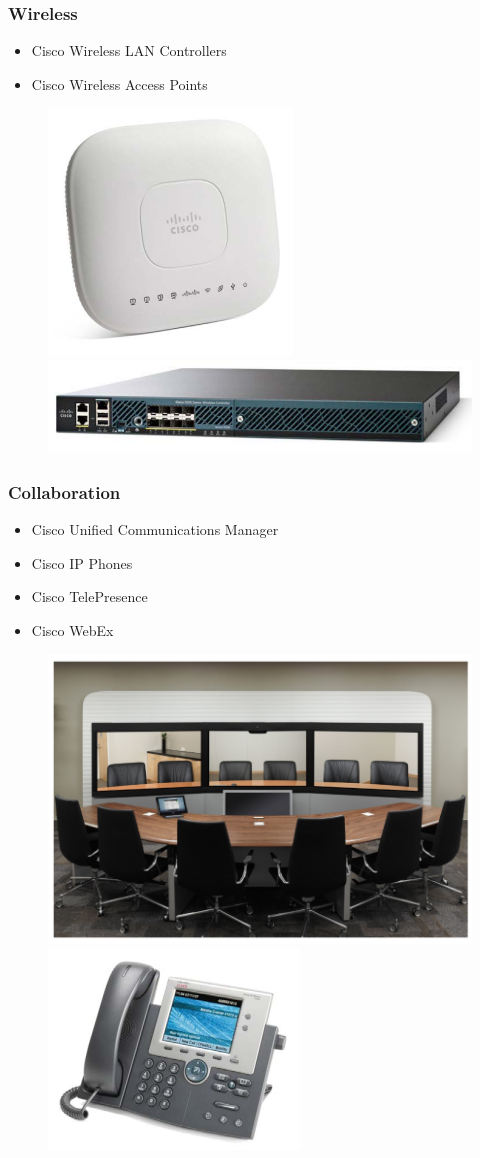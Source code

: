 \documentclass[pdflatex,compress,mathserif]{beamer}
\begin{document}
\begin{frame}
	\frametitle{Wireless}
	\begin{itemize}
		\item Cisco Wireless LAN Controllers
		\item Cisco Wireless Access Points
	\end{itemize}
	\begin{figure}
		\centering
		\includegraphics[width=0.3\linewidth]{img/img34}
		\includegraphics[width=0.4\linewidth]{img/img35}
	\end{figure}
\end{frame}

\begin{frame}
	\frametitle{Collaboration}
	\begin{itemize}
		\item Cisco Unified Communications Manager
		\item Cisco IP Phones
		\item Cisco TelePresence
		\item Cisco WebEx
	\end{itemize}
	\begin{figure}
		\centering
		\includegraphics[width=0.5\linewidth]{img/img36}
		\includegraphics[width=0.3\linewidth]{img/img37}
	\end{figure}
\end{frame}
\end{document}
